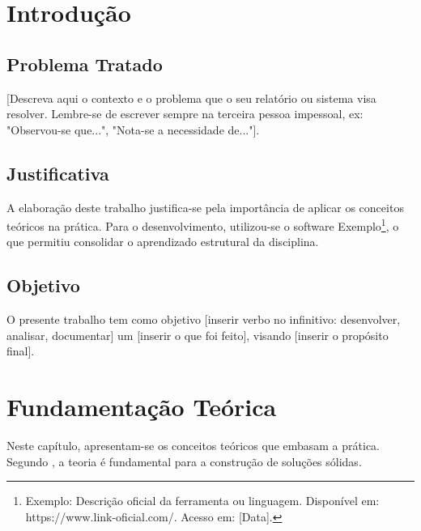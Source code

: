 \documentclass[
    12pt,
    openright,
    oneside,
    a4paper,
    english,
    french,
    spanish,
    brazil
]{abntex2}
\renewcommand{\lstlistlistingname}{Lista de listagens}
\begin{document}
\frenchspacing

\imprimircapa
\imprimirfolhaderosto

\listoffigures*
\cleardoublepage

\pdfbookmark[0]{\lstlistlistingname}{lol}
\lstlistoflistings*
\cleardoublepage

\tableofcontents*
\cleardoublepage

\textual

\chapter{Introdução}
\section{Problema Tratado}
[Descreva aqui o contexto e o problema que o seu relatório ou sistema visa resolver. Lembre-se de escrever sempre na terceira pessoa impessoal, ex: "Observou-se que...", "Nota-se a necessidade de..."]. 

\section{Justificativa}
A elaboração deste trabalho justifica-se pela importância de aplicar os conceitos teóricos na prática. Para o desenvolvimento, utilizou-se o software Exemplo\footnote{Exemplo: Descrição oficial da ferramenta ou linguagem. Disponível em: https://www.link-oficial.com/. Acesso em: [Data].}, o que permitiu consolidar o aprendizado estrutural da disciplina.

\section{Objetivo}
O presente trabalho tem como objetivo [inserir verbo no infinitivo: desenvolver, analisar, documentar] um [inserir o que foi feito], visando [inserir o propósito final].

\chapter{Fundamentação Teórica}
Neste capítulo, apresentam-se os conceitos teóricos que embasam a prática. Segundo , a teoria é fundamental para a construção de soluções sólidas. 
\end{document}
